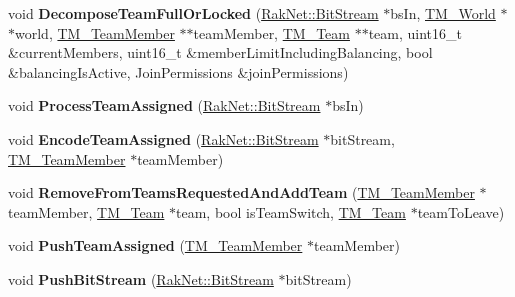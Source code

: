 \begin{DoxyCompactItemize}
\item 
\hypertarget{class_rak_net_1_1_team_manager_ab9b210e2e1d26c4c37fcb0c9d5d244cb}{void {\bfseries Decompose\-Team\-Full\-Or\-Locked} (\hyperlink{class_rak_net_1_1_bit_stream}{Rak\-Net\-::\-Bit\-Stream} $\ast$bs\-In, \hyperlink{class_rak_net_1_1_t_m___world}{T\-M\-\_\-\-World} $\ast$$\ast$world, \hyperlink{class_rak_net_1_1_t_m___team_member}{T\-M\-\_\-\-Team\-Member} $\ast$$\ast$team\-Member, \hyperlink{class_rak_net_1_1_t_m___team}{T\-M\-\_\-\-Team} $\ast$$\ast$team, uint16\-\_\-t \&current\-Members, uint16\-\_\-t \&member\-Limit\-Including\-Balancing, bool \&balancing\-Is\-Active, Join\-Permissions \&join\-Permissions)}\label{class_rak_net_1_1_team_manager_ab9b210e2e1d26c4c37fcb0c9d5d244cb}

\item 
\hypertarget{class_rak_net_1_1_team_manager_a2f7e886320334e334c24af79532c4900}{void {\bfseries Process\-Team\-Assigned} (\hyperlink{class_rak_net_1_1_bit_stream}{Rak\-Net\-::\-Bit\-Stream} $\ast$bs\-In)}\label{class_rak_net_1_1_team_manager_a2f7e886320334e334c24af79532c4900}

\item 
\hypertarget{class_rak_net_1_1_team_manager_a591cb426509f656a1cf292d71b80fbd9}{void {\bfseries Encode\-Team\-Assigned} (\hyperlink{class_rak_net_1_1_bit_stream}{Rak\-Net\-::\-Bit\-Stream} $\ast$bit\-Stream, \hyperlink{class_rak_net_1_1_t_m___team_member}{T\-M\-\_\-\-Team\-Member} $\ast$team\-Member)}\label{class_rak_net_1_1_team_manager_a591cb426509f656a1cf292d71b80fbd9}

\item 
\hypertarget{class_rak_net_1_1_team_manager_aad806120a60d9e81a8c9cc46c2363137}{void {\bfseries Remove\-From\-Teams\-Requested\-And\-Add\-Team} (\hyperlink{class_rak_net_1_1_t_m___team_member}{T\-M\-\_\-\-Team\-Member} $\ast$team\-Member, \hyperlink{class_rak_net_1_1_t_m___team}{T\-M\-\_\-\-Team} $\ast$team, bool is\-Team\-Switch, \hyperlink{class_rak_net_1_1_t_m___team}{T\-M\-\_\-\-Team} $\ast$team\-To\-Leave)}\label{class_rak_net_1_1_team_manager_aad806120a60d9e81a8c9cc46c2363137}

\item 
\hypertarget{class_rak_net_1_1_team_manager_a7c82e9d406c6693fb88278956c183a4e}{void {\bfseries Push\-Team\-Assigned} (\hyperlink{class_rak_net_1_1_t_m___team_member}{T\-M\-\_\-\-Team\-Member} $\ast$team\-Member)}\label{class_rak_net_1_1_team_manager_a7c82e9d406c6693fb88278956c183a4e}

\item 
\hypertarget{class_rak_net_1_1_team_manager_a79d1937ecda4117b2e60262f94b86f93}{void {\bfseries Push\-Bit\-Stream} (\hyperlink{class_rak_net_1_1_bit_stream}{Rak\-Net\-::\-Bit\-Stream} $\ast$bit\-Stream)}\label{class_rak_net_1_1_team_manager_a79d1937ecda4117b2e60262f94b86f93}


\end{DoxyCompactItemize}
